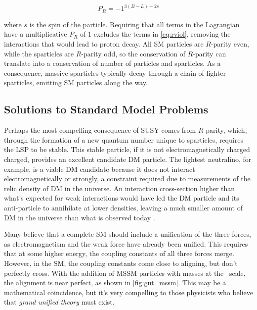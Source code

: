 \begin{equation}
P_R = -1^{3(B-L)+2s}
\end{equation}

where $s$ is the spin of the particle. Requiring that all terms in the Lagrangian have a multiplicative $P_R$ of 1 excludes the terms in \autoref{eq:rviol}, removing the interactions that would lead to proton decay. All \ac{SM} particles are $R$-parity even, while the sparticles are $R$-parity odd, so the conservation of $R$-parity can translate into a conservation of number of particles and sparticles. As a consequence, massive sparticles typically decay through a chain of lighter sparticles, emitting \ac{SM} particles along the way.  

\subsection{Solutions to Standard Model Problems}

Perhaps the most compelling consequence of \ac{SUSY} comes from $R$-parity, which, through the formation of a new quantum number unique to sparticles, requires the \acf{LSP} to be stable. This stable particle, if it is not electromagnetically charged charged, provides an excellent candidate \ac{DM} particle. The lightest neutralino, for example, is a viable \ac{DM} candidate because it does not interact electromagnetically or strongly, a constraint required due to measurements of the relic density of \ac{DM} in the universe. An interaction cross-section higher than what's expected for weak interactions would have led the \ac{DM} particle and its anti-particle to annihilate at lower densities, leaving a much smaller amount of \ac{DM} in the universe than what is observed today \cite{astro-ph/9407006}.

Many believe that a complete \ac{SM} should include a unification of the three forces, as electromagnetism and the weak force have already been unified. This requires that at some higher energy, the coupling constants of all three forces merge. However, in the \ac{SM}, the coupling constants come close to aligning, but don't perfectly cross. With the addition of \ac{MSSM} particles with masses at the \tev~scale, the alignment is near perfect, as shown in \autoref{fig:gut_mssm}. This may be a mathematical coincidence, but it's very compelling to those physicists who believe that \textit{grand unified theory} must exist. 

